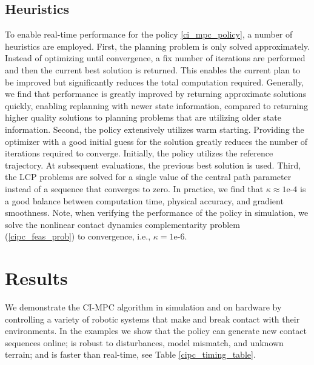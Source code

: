 \subsection{Heuristics}
To enable real-time performance for the policy \eqref{ci_mpc_policy}, a number of heuristics are employed. First, the planning problem is only solved approximately. Instead of optimizing until convergence, a fix number of iterations are performed and then the current best solution is returned. This enables the current plan to be improved but significantly reduces the total computation required. Generally, we find that performance is greatly improved by returning approximate solutions quickly, enabling replanning with newer state information, compared to returning higher quality solutions to planning problems that are utilizing older state information. Second, the policy extensively utilizes warm starting. Providing the optimizer with a good initial guess for the solution greatly reduces the number of iterations required to converge. Initially, the policy utilizes the reference trajectory. At subsequent evaluations, the previous best solution is used.
Third, the LCP problems are solved for a single value of the central path parameter instead of a sequence that converges to zero. In practice, we find that $\kappa \approx 1\mbox{e-}4$ is a good balance between computation time, physical accuracy, and gradient smoothness. Note, when verifying the performance of the policy in simulation, we solve the nonlinear contact dynamics complementarity problem (\ref{cipc_feas_prob}) to convergence, i.e., $\kappa = 1\mbox{e-}6$.

\section{Results} \label{cipc_results}
We demonstrate the CI-MPC algorithm in simulation and on hardware by controlling a variety of robotic systems that make and break contact with their environments. In the examples we show that the policy can generate new contact sequences online; is robust to disturbances, model mismatch, and unknown terrain; and is faster than real-time, see Table \ref{cipc_timing_table}. 

